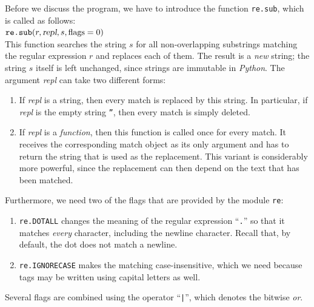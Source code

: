 \noindent
Before we discuss the program, we have to introduce the function
\texttt{re.sub}, which is called as follows:
\\[0.2cm]
\hspace*{1.3cm}
$\texttt{re.sub}(r, \textsl{repl}, s, \textrm{flags}=0)$
\\[0.2cm]
This function searches the string $s$ for all non-overlapping substrings matching the regular expression $r$
and replaces each of them.  The result is a \emph{new} string; the string $s$ itself is left unchanged, since
strings are immutable in \textsl{Python}.  The argument \textsl{repl} can take two different forms:
\begin{enumerate}
\item If \textsl{repl} is a string, then every match is replaced by this string.  In particular, if
      \textsl{repl} is the empty string \texttt{''}, then every match is simply deleted.
\item If \textsl{repl} is a \emph{function}, then this function is called once for every match.  It receives the
      corresponding match object as its only argument and has to return the string that is used as the
      replacement.  This variant is considerably more powerful, since the replacement can then depend on the
      text that has been matched.
\end{enumerate}
Furthermore, we need two of the flags that are provided by the module \texttt{re}:
\begin{enumerate}
\item \texttt{re.DOTALL} changes the meaning of the regular expression
      ``\texttt{.}'' so that it matches \emph{every} character, including the newline character.  Recall that,
      by default, the dot does not match a newline.
\item \texttt{re.IGNORECASE} makes the matching case-insensitive, which we need because
       tags may be written using capital letters as well.
\end{enumerate}
Several flags are combined using the operator ``\texttt{|}'', which denotes the bitwise \emph{or}.

